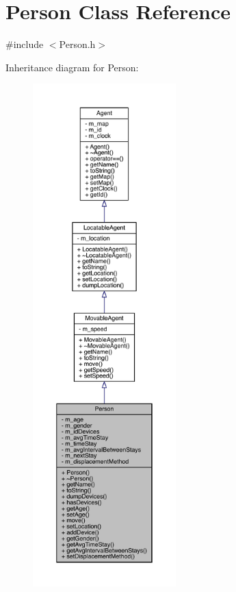 \hypertarget{class_person}{}\section{Person Class Reference}
\label{class_person}


{\ttfamily \#include $<$Person.\+h$>$}



Inheritance diagram for Person\+:
\nopagebreak
\begin{figure}[H]
\begin{center}
\leavevmode
\includegraphics[height=550pt]{class_person__inherit__graph}
\end{center}
\end{figure}


